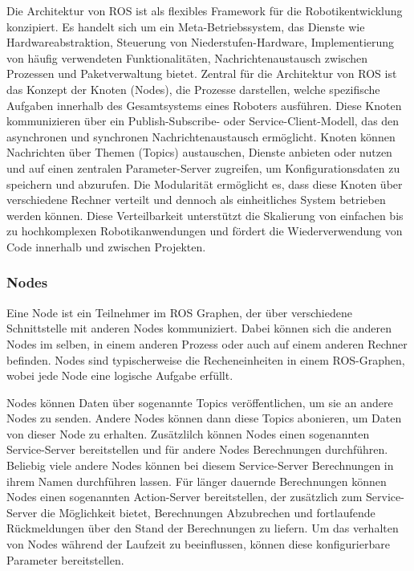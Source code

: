 Die Architektur von \ac{ROS} ist als flexibles Framework für die Robotikentwicklung konzipiert. Es handelt sich um ein Meta-Betriebssystem, das Dienste wie Hardwareabstraktion, Steuerung von Niederstufen-Hardware, Implementierung von häufig verwendeten Funktionalitäten, Nachrichtenaustausch zwischen Prozessen und Paketverwaltung bietet.
Zentral für die Architektur von \ac{ROS} ist das Konzept der Knoten (Nodes), die Prozesse darstellen, welche spezifische Aufgaben innerhalb des Gesamtsystems eines Roboters ausführen. Diese Knoten kommunizieren über ein Publish-Subscribe- oder Service-Client-Modell, das den asynchronen und synchronen Nachrichtenaustausch ermöglicht. Knoten können Nachrichten über Themen (Topics) austauschen, Dienste anbieten oder nutzen und auf einen zentralen Parameter-Server zugreifen, um Konfigurationsdaten zu speichern und abzurufen.
Die Modularität ermöglicht es, dass diese Knoten über verschiedene Rechner verteilt und dennoch als einheitliches System betrieben werden können. Diese Verteilbarkeit unterstützt die Skalierung von einfachen bis zu hochkomplexen Robotikanwendungen und fördert die Wiederverwendung von Code innerhalb und zwischen Projekten.



\subsubsection*{Nodes}

Eine Node ist ein Teilnehmer im \ac{ROS} Graphen, der über verschiedene Schnittstelle mit anderen Nodes kommuniziert. Dabei können sich die anderen Nodes im selben, in einem anderen Prozess oder auch auf einem anderen Rechner befinden. Nodes sind typischerweise die Recheneinheiten in einem ROS-Graphen, wobei jede Node eine logische Aufgabe erfüllt.

Nodes können Daten über sogenannte Topics veröffentlichen, um sie an andere Nodes zu senden. Andere Nodes können dann diese Topics abonieren, um Daten von dieser Node zu erhalten. Zusätzlilch können Nodes einen sogenannten Service-Server bereitstellen und für andere Nodes Berechnungen durchführen. Beliebig viele andere Nodes können bei diesem Service-Server Berechnungen in ihrem Namen durchführen lassen. Für länger dauernde Berechnungen können Nodes einen sogenannten Action-Server bereitstellen, der zusätzlich zum Service-Server die Möglichkeit bietet, Berechnungen Abzubrechen und fortlaufende Rückmeldungen über den Stand der Berechnungen zu liefern. Um das verhalten von Nodes während der Laufzeit zu beeinflussen, können diese konfigurierbare Parameter bereitstellen.

